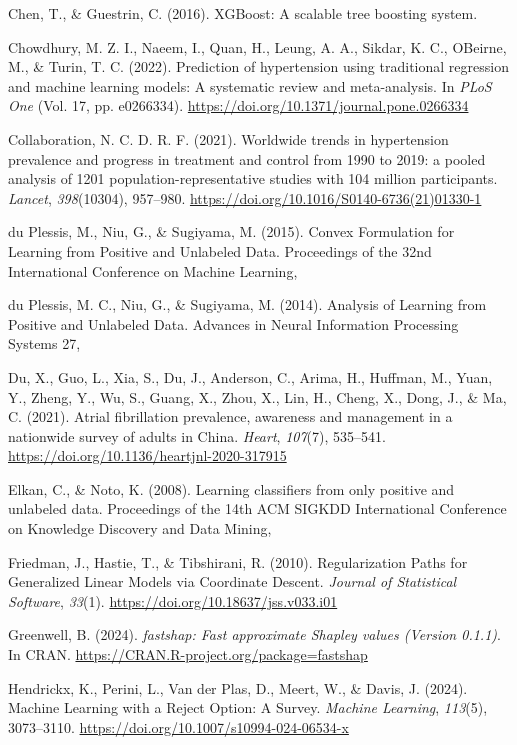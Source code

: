 \documentclass[10pt]{article}
\begin{document}
Chen, T., \& Guestrin, C. (2016). XGBoost: A scalable tree boosting
system.

Chowdhury, M. Z. I., Naeem, I., Quan, H., Leung, A. A., Sikdar, K. C.,
O\textquotesingle Beirne, M., \& Turin, T. C. (2022). Prediction of
hypertension using traditional regression and machine learning models: A
systematic review and meta-analysis. In \emph{PLoS One} (Vol. 17, pp.
e0266334). \url{https://doi.org/10.1371/journal.pone.0266334}

Collaboration, N. C. D. R. F. (2021). Worldwide trends in hypertension
prevalence and progress in treatment and control from 1990 to 2019: a
pooled analysis of 1201 population-representative studies with 104
million participants. \emph{Lancet}, \emph{398}(10304), 957--980.
\url{https://doi.org/10.1016/S0140-6736(21)01330-1}

du Plessis, M., Niu, G., \& Sugiyama, M. (2015). Convex Formulation for
Learning from Positive and Unlabeled Data. Proceedings of the 32nd
International Conference on Machine Learning,

du Plessis, M. C., Niu, G., \& Sugiyama, M. (2014). Analysis of Learning
from Positive and Unlabeled Data. Advances in Neural Information
Processing Systems 27,

Du, X., Guo, L., Xia, S., Du, J., Anderson, C., Arima, H., Huffman, M.,
Yuan, Y., Zheng, Y., Wu, S., Guang, X., Zhou, X., Lin, H., Cheng, X.,
Dong, J., \& Ma, C. (2021). Atrial fibrillation prevalence, awareness
and management in a nationwide survey of adults in China. \emph{Heart},
\emph{107}(7), 535--541.
\url{https://doi.org/10.1136/heartjnl-2020-317915}

Elkan, C., \& Noto, K. (2008). Learning classifiers from only positive
and unlabeled data. Proceedings of the 14th ACM SIGKDD International
Conference on Knowledge Discovery and Data Mining,

Friedman, J., Hastie, T., \& Tibshirani, R. (2010). Regularization Paths
for Generalized Linear Models via Coordinate Descent. \emph{Journal of
Statistical Software}, \emph{33}(1).
\url{https://doi.org/10.18637/jss.v033.i01}

Greenwell, B. (2024). \emph{fastshap: Fast approximate Shapley values
(Version 0.1.1)}. In CRAN.
\url{https://CRAN.R-project.org/package=fastshap}

Hendrickx, K., Perini, L., Van der Plas, D., Meert, W., \& Davis, J.
(2024). Machine Learning with a Reject Option: A Survey. \emph{Machine
Learning}, \emph{113}(5), 3073--3110.
\url{https://doi.org/10.1007/s10994-024-06534-x}
\end{document}
